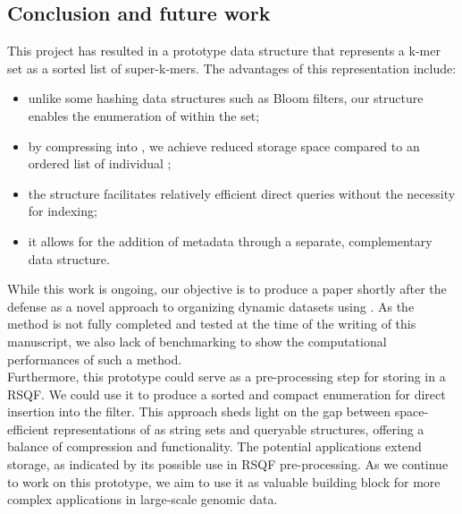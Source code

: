\subsection{Conclusion and future work}
This project has resulted in a prototype data structure that represents a k-mer set as a sorted list of super-k-mers. The advantages of this representation include:
\begin{itemize}
	\item unlike some hashing data structures such as Bloom filters, our structure enables the enumeration of \kmers within the set;
	\item by compressing \kmers into \skmers, we achieve reduced storage space compared to an ordered list of individual \kmers;
	\item the structure facilitates relatively efficient direct queries without the necessity for indexing;
	\item it allows for the addition of metadata through a separate, complementary data structure.
\end{itemize}
While this work is ongoing, our objective is to produce a paper shortly after the defense as a novel approach to organizing dynamic datasets using \kmers. As the method is not fully completed and tested at the time of the writing of this manuscript, we also lack of benchmarking to show the computational performances of such a method.\\
Furthermore, this prototype could serve as a pre-processing step for storing \kmers in a RSQF. We could use it to produce a sorted and compact \kmer enumeration for direct insertion into the filter.
This approach sheds light on the gap between space-efficient representations of \kmers as string sets and queryable structures, offering a balance of compression and functionality. The potential applications extend storage, as indicated by its possible use in RSQF pre-processing. As we continue to work on this prototype, we aim to use it as valuable building block for more complex applications in large-scale genomic data.

